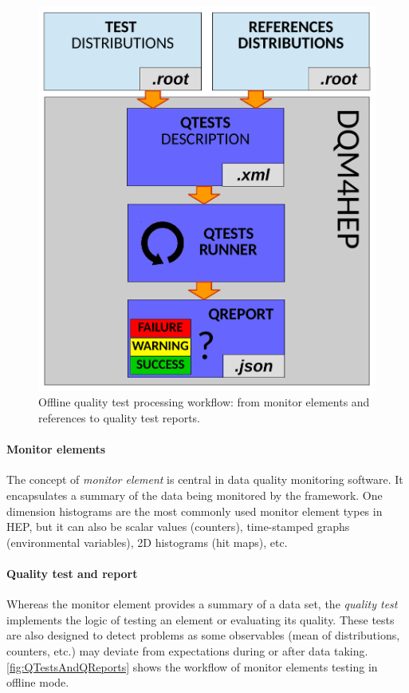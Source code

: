 \documentclass{webofc}
\begin{document}
{ %

\begin{figure}
    \includegraphics[width=\linewidth]{figs/QTestRunner.pdf}
    \caption{Offline quality test processing workflow: from monitor elements and references to quality test reports.}
    \label{fig:QTestsAndQReports}
\end{figure}

\paragraph{Monitor elements}

The concept of \textit{monitor element} is central in data quality monitoring software.
It encapsulates a summary of the data being monitored by the framework.
One dimension histograms are the most commonly used monitor element types in HEP, but it can also be scalar values (counters), time-stamped graphs (environmental variables), 2D histograms (hit maps), etc.

\paragraph{Quality test and report}

Whereas the monitor element provides a summary of a data set, the \textit{quality test} implements the logic of testing an element or evaluating its quality.
These tests are also designed to detect problems as some observables (mean of distributions, counters, etc.) may deviate from expectations during or after data taking. \autoref{fig:QTestsAndQReports} shows the workflow of monitor elements testing in offline mode.

} %
\end{document}
